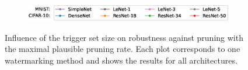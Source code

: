 \begin{figure}
    
    \begin{subfigure}{\linewidth}
    \centering
    \includegraphics[width=0.7\linewidth]{images/pruning/per_method/legend_pruning_per_method_maximal_pr_rate.eps}
    \end{subfigure}
    
    \caption{Influence of the trigger set size on robustness against pruning with the maximal plausible pruning rate. Each plot corresponds to one watermarking method and shows the results for all architectures.}
    \label{fig:pruning-max-pr-rate-permethod}
\end{figure}
